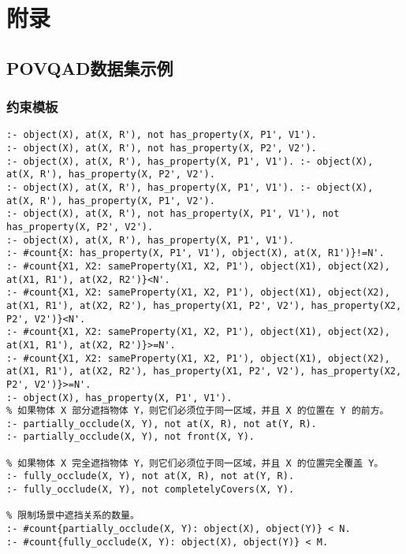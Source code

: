 \chapter{附录}
\section{POVQAD数据集示例}
\subsection{约束模板}
\label{appendix:constraints}
\begin{lstlisting}
:- object(X), at(X, R'), not has_property(X, P1', V1'). 
:- object(X), at(X, R'), not has_property(X, P2', V2').
:- object(X), at(X, R'), has_property(X, P1', V1'). :- object(X), at(X, R'), has_property(X, P2', V2').
:- object(X), at(X, R'), has_property(X, P1', V1'). :- object(X), at(X, R'), has_property(X, P1', V2').
:- object(X), at(X, R'), not has_property(X, P1', V1'), not has_property(X, P2', V2').
:- object(X), at(X, R'), has_property(X, P1', V1').
:- #count{X: has_property(X, P1', V1'), object(X), at(X, R1')}!=N'.
:- #count{X1, X2: sameProperty(X1, X2, P1'), object(X1), object(X2), at(X1, R1'), at(X2, R2')}<N'.
:- #count{X1, X2: sameProperty(X1, X2, P1'), object(X1), object(X2), at(X1, R1'), at(X2, R2'), has_property(X1, P2', V2'), has_property(X2, P2', V2')}<N'.
:- #count{X1, X2: sameProperty(X1, X2, P1'), object(X1), object(X2), at(X1, R1'), at(X2, R2')}>=N'.
:- #count{X1, X2: sameProperty(X1, X2, P1'), object(X1), object(X2), at(X1, R1'), at(X2, R2'), has_property(X1, P2', V2'), has_property(X2, P2', V2')}>=N'.
:- object(X), has_property(X, P1', V1').
% 如果物体 X 部分遮挡物体 Y，则它们必须位于同一区域，并且 X 的位置在 Y 的前方。
:- partially_occlude(X, Y), not at(X, R), not at(Y, R).
:- partially_occlude(X, Y), not front(X, Y).

% 如果物体 X 完全遮挡物体 Y，则它们必须位于同一区域，并且 X 的位置完全覆盖 Y。
:- fully_occlude(X, Y), not at(X, R), not at(Y, R).
:- fully_occlude(X, Y), not completelyCovers(X, Y).

% 限制场景中遮挡关系的数量。
:- #count{partially_occlude(X, Y): object(X), object(Y)} < N.
:- #count{fully_occlude(X, Y): object(X), object(Y)} < M.
\end{lstlisting}

